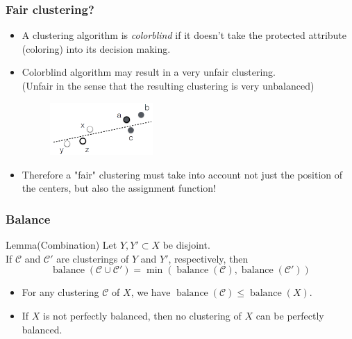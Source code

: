 \documentclass{beamer}
\DeclareMathOperator{\balance}{balance}
\begin{document}


\begin{frame}
\frametitle{Fair clustering?}

\begin{itemize}
	\item A clustering algorithm is {\it colorblind} if it doesn't take the protected attribute (coloring) into its decision making. \pause
	\item Colorblind algorithm may result in a very unfair clustering.\\
	(Unfair in the sense that the resulting clustering is very unbalanced)
		\begin{figure}[hbt]
  			\includegraphics[height=2cm]{fig1.png}
		\end{figure} \pause

	\item Therefore a "fair" clustering must take into account not just the position of the centers, but also the assignment function!

\end{itemize}

\end{frame}



\begin{frame}
\frametitle{Balance}

\begin{block}{Lemma(Combination)}
Let $Y, Y' \subset X$ be disjoint.\\
If $\mathcal{C}$ and $\mathcal{C}'$ are clusterings of $Y$ and $Y'$, respectively, then
$$\balance(\mathcal{C} \cup \mathcal{C}') = \min(\balance(\mathcal{C}), \balance(\mathcal{C}'))$$
\end{block}

\begin{itemize}
	\item For any clustering $\mathcal{C}$ of $X$, we have $\balance(\mathcal{C}) \leq \balance(X)$.
	\item If $X$ is not perfectly balanced, then no clustering of $X$ can be perfectly balanced.
\end{itemize}

\end{frame}
\end{document}

